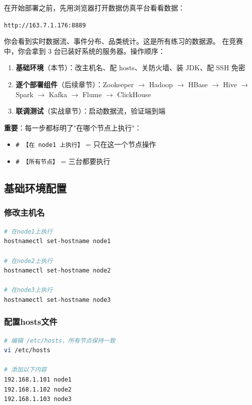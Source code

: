 \documentclass[12pt,a4paper]{article}
\begin{document}
\begin{tipbox}[竞赛中的操作流程]

在开始部署之前，先用浏览器打开数据仿真平台看看数据：

\texttt{http://163.7.1.176:8889}

你会看到实时数据流、事件分布、品类统计。这是所有练习的数据源。
在竞赛中，你会拿到 3 台已装好系统的服务器。操作顺序：

\begin{enumerate}
    \item \textbf{基础环境}（本节）：改主机名、配 hosts、关防火墙、装 JDK、配 SSH 免密
    \item \textbf{逐个部署组件}（后续章节）：Zookeeper $\rightarrow$ Hadoop $\rightarrow$ HBase $\rightarrow$ Hive $\rightarrow$ Spark $\rightarrow$ Kafka $\rightarrow$ Flume $\rightarrow$ ClickHouse
    \item \textbf{联调测试}（实战章节）：启动数据流，验证端到端
\end{enumerate}

\textbf{重要}：每一步都标明了"在哪个节点上执行"：
\begin{itemize}
    \item \texttt{\# 【在 node1 上执行】} = 只在这一个节点操作
    \item \texttt{\# 【所有节点】} = 三台都要执行
\end{itemize}
\end{tipbox}

\subsection{基础环境配置}

\subsubsection{修改主机名}

\begin{lstlisting}[language=bash]
# 在node1上执行
hostnamectl set-hostname node1

# 在node2上执行
hostnamectl set-hostname node2

# 在node3上执行
hostnamectl set-hostname node3
\end{lstlisting}

\subsubsection{配置hosts文件}

\begin{lstlisting}[language=bash]
# 编辑 /etc/hosts，所有节点保持一致
vi /etc/hosts

# 添加以下内容
192.168.1.101 node1
192.168.1.102 node2
192.168.1.103 node3
\end{lstlisting}
\end{document}
